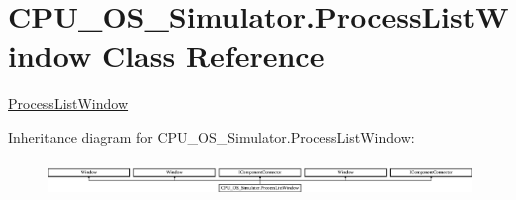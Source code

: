\hypertarget{class_c_p_u___o_s___simulator_1_1_process_list_window}{}\section{C\+P\+U\+\_\+\+O\+S\+\_\+\+Simulator.\+Process\+List\+Window Class Reference}
\label{class_c_p_u___o_s___simulator_1_1_process_list_window}


\hyperlink{class_c_p_u___o_s___simulator_1_1_process_list_window}{Process\+List\+Window}  


Inheritance diagram for C\+P\+U\+\_\+\+O\+S\+\_\+\+Simulator.\+Process\+List\+Window\+:\begin{figure}[H]
\begin{center}
\leavevmode
\includegraphics[height=0.925620cm]{class_c_p_u___o_s___simulator_1_1_process_list_window}
\end{center}
\end{figure}
